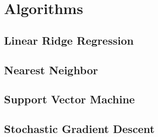 \section{Algorithms}
\subsection{Linear Ridge Regression}
\subsection{Nearest Neighbor}
\subsection{Support Vector Machine}
\subsection{Stochastic Gradient Descent}
